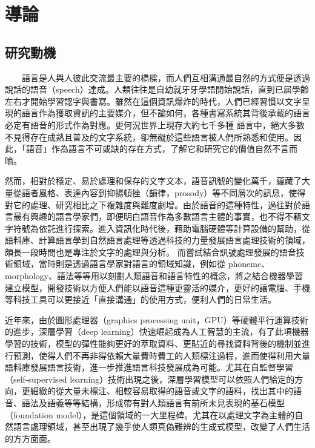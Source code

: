 \chapter{導論}
\section{研究動機}  %

　　語言是人與人彼此交流最主要的橋樑，而人們互相溝通最自然的方式便是透過說話的語音（speech）達成。人類往往是自幼就牙牙學語開始說話，直到已屆學齡左右才開始學習認字與書寫。雖然在這個資訊爆炸的時代，人們已經習慣以文字呈現的語言作為獲取資訊的主要媒介，但不論如何，各種書寫系統其背後承載的語言必定有語音的形式作為對應。更何況世界上現存大約七千多種  \cite{ethnologue}  語言中，絕大多數不見得存在成熟且普及的文字系統，卻無礙於這些語言被人們所熟悉和使用。因此，「語音」作為語言不可或缺的存在方式，了解它和研究它的價值自然不言而喻。

    然而，相對於穩定、易於處理和保存的文字文本，語音訊號的變化萬千，蘊藏了大量從語者風格、表達內容到抑揚頓挫（韻律，prosody）等不同層次的訊息，使得對它的處理、研究相比之下複雜度與難度劇增。由於語音的這種特性，過往對於語言最有興趣的語言學家們，即便明白語音作為多數語言主體的事實，也不得不藉文字符號為依託進行探索。進入資訊化時代後，藉助電腦硬體等計算設備的幫助，從語料庫、計算語言學到自然語言處理等透過科技的力量發展語言處理技術的領域，頗長一段時間也是專注於文字的處理與分析。
而嘗試結合訊號處理發展的語音技術領域，當時則是透過語言學家對語言的領域知識，例如從 phoneme、morphology、語法等等用以刻劃人類語音和語言特性的概念，將之結合機器學習建立模型，開發技術以方便人們能以語音這種更靈活的媒介，更好的讓電腦、手機等科技工具可以更接近「直接溝通」的使用方式，便利人們的日常生活。

    近年來，由於圖形處理器（graphics processing unit，GPU）等硬體平行運算技術的進步，深層學習（deep learning）快速崛起成為人工智慧的主流，有了此項機器學習的技術，模型的彈性能夠更好的萃取資料、更貼近的尋找資料背後的機制並進行預測，使得人們不再非得依賴大量費時費工的人類標注過程，進而使得利用大量語料庫發展語言技術，進一步推進語言科技發展成為可能。尤其在自監督學習（self-supervised learning）技術出現之後，深層學習模型可以依照人們給定的方向，更細緻的從大量未標注、相較容易取得的語音或文字的語料，找出其中的語音、語法及語義等等結構，形成帶有對人類語言有前所未見表現的基石模型（foundation model），是這個領域的一大里程碑。尤其在以處理文字為主體的自然語言處理領域，甚至出現了幾乎使人類真偽難辨的生成式模型，改變了人們生活的方方面面。

